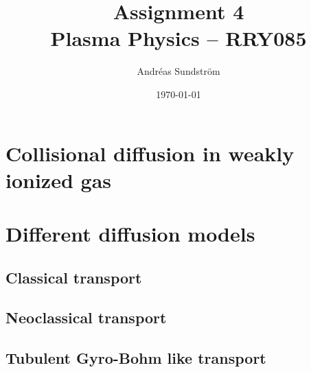 \documentclass[11pt,a4paper, 
swedish, english %
]{article}
\begin{document}


\title{Assignment 4 \\
{\Large Plasma Physics -- RRY085}}
\author{Andréas Sundström}
\date\today%

\maketitle


\section{Collisional diffusion in weakly ionized gas}

\section{Different diffusion models}
\subsection{Classical transport}
\subsection{Neoclassical transport}
\subsection{Tubulent Gyro-Bohm like transport}
\end{document}

